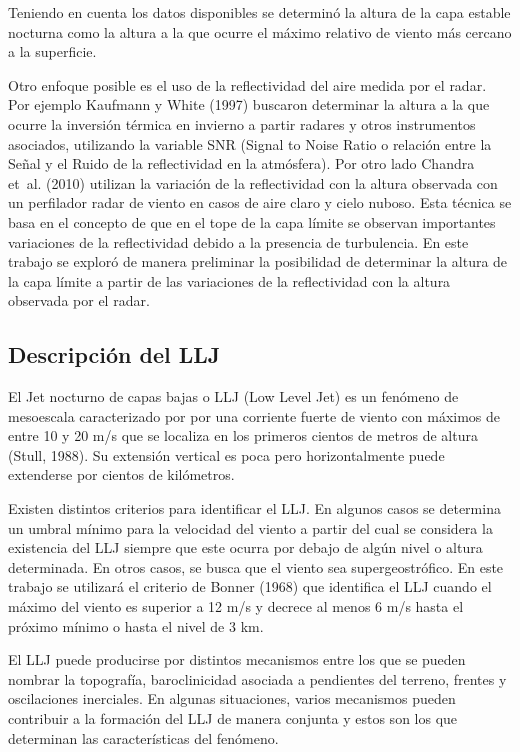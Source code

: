 \documentclass[12pt,spanish,oneside, a4paper]{book}
\begin{document}
Teniendo en cuenta los datos disponibles se determinó la altura de la
capa estable nocturna como la altura a la que ocurre el máximo relativo
de viento más cercano a la superficie.

Otro enfoque posible es el uso de la reflectividad del aire medida por
el radar. Por ejemplo Kaufmann y White (1997) buscaron determinar la
altura a la que ocurre la inversión térmica en invierno a partir radares
y otros instrumentos asociados, utilizando la variable SNR (Signal to
Noise Ratio o relación entre la Señal y el Ruido de la reflectividad en
la atmósfera). Por otro lado Chandra et~al. (2010) utilizan la variación
de la reflectividad con la altura observada con un perfilador radar de
viento en casos de aire claro y cielo nuboso. Esta técnica se basa en el
concepto de que en el tope de la capa límite se observan importantes
variaciones de la reflectividad debido a la presencia de turbulencia. En
este trabajo se exploró de manera preliminar la posibilidad de
determinar la altura de la capa límite a partir de las variaciones de la
reflectividad con la altura observada por el radar.

\subsection{Descripción del LLJ}\label{descripcion-del-llj}

El Jet nocturno de capas bajas o LLJ (Low Level Jet) es un fenómeno de
mesoescala caracterizado por por una corriente fuerte de viento con
máximos de entre 10 y 20 m/s que se localiza en los primeros cientos de
metros de altura (Stull, 1988). Su extensión vertical es poca pero
horizontalmente puede extenderse por cientos de kilómetros.

Existen distintos criterios para identificar el LLJ. En algunos casos se
determina un umbral mínimo para la velocidad del viento a partir del
cual se considera la existencia del LLJ siempre que este ocurra por
debajo de algún nivel o altura determinada. En otros casos, se busca que
el viento sea supergeostrófico. En este trabajo se utilizará el criterio
de Bonner (1968) que identifica el LLJ cuando el máximo del viento es
superior a 12 m/s y decrece al menos 6 m/s hasta el próximo mínimo o
hasta el nivel de 3 km.

El LLJ puede producirse por distintos mecanismos entre los que se pueden
nombrar la topografía, baroclinicidad asociada a pendientes del terreno,
frentes y oscilaciones inerciales. En algunas situaciones, varios
mecanismos pueden contribuir a la formación del LLJ de manera conjunta y
estos son los que determinan las características del fenómeno.
\end{document}
